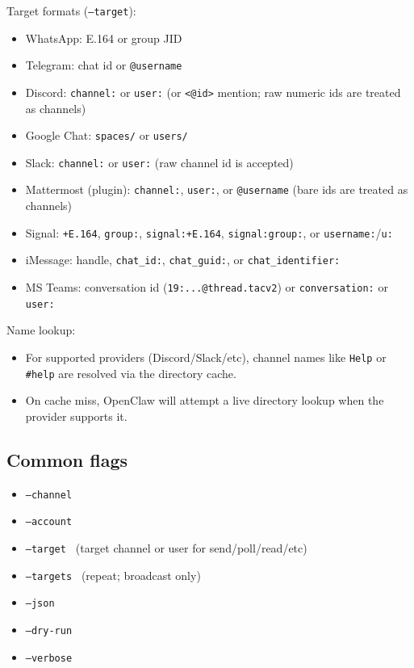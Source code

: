 Target formats (\texttt{--target}):

\begin{itemize}
  \item WhatsApp: E.164 or group JID
  \item Telegram: chat id or \texttt{@username}
  \item Discord: \texttt{channel:} or \texttt{user:} (or \texttt{<@id>} mention; raw numeric ids are treated as channels)
  \item Google Chat: \texttt{spaces/} or \texttt{users/}
  \item Slack: \texttt{channel:} or \texttt{user:} (raw channel id is accepted)
  \item Mattermost (plugin): \texttt{channel:}, \texttt{user:}, or \texttt{@username} (bare ids are treated as channels)
  \item Signal: \texttt{+E.164}, \texttt{group:}, \texttt{signal:+E.164}, \texttt{signal:group:}, or \texttt{username:}/\texttt{u:}
  \item iMessage: handle, \texttt{chat\_id:}, \texttt{chat\_guid:}, or \texttt{chat\_identifier:}
  \item MS Teams: conversation id (\texttt{19:...@thread.tacv2}) or \texttt{conversation:} or \texttt{user:}
\end{itemize}


Name lookup:

\begin{itemize}
  \item For supported providers (Discord/Slack/etc), channel names like \texttt{Help} or \texttt{\#help} are resolved via the directory cache.
  \item On cache miss, OpenClaw will attempt a live directory lookup when the provider supports it.
\end{itemize}


\subsection{Common flags}


\begin{itemize}
  \item \texttt{--channel }
  \item \texttt{--account }
  \item \texttt{--target } (target channel or user for send/poll/read/etc)
  \item \texttt{--targets } (repeat; broadcast only)
  \item \texttt{--json}
  \item \texttt{--dry-run}
  \item \texttt{--verbose}
\end{itemize}


